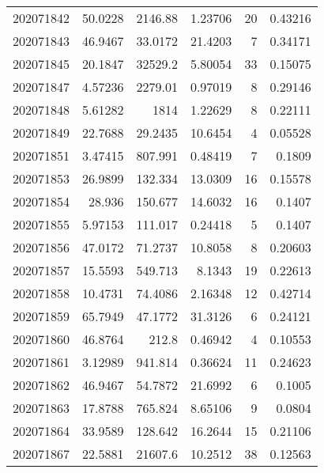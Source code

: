 \begin{tabular}{rrrrrr}
 202071842 &         50.0228  &     2146.88   &            1.23706 &          20 & 0.43216 \\
 202071843 &         46.9467  &       33.0172 &           21.4203  &           7 & 0.34171 \\
 202071845 &         20.1847  &    32529.2    &            5.80054 &          33 & 0.15075 \\
 202071847 &          4.57236 &     2279.01   &            0.97019 &           8 & 0.29146 \\
 202071848 &          5.61282 &     1814      &            1.22629 &           8 & 0.22111 \\
 202071849 &         22.7688  &       29.2435 &           10.6454  &           4 & 0.05528 \\
 202071851 &          3.47415 &      807.991  &            0.48419 &           7 & 0.1809  \\
 202071853 &         26.9899  &      132.334  &           13.0309  &          16 & 0.15578 \\
 202071854 &         28.936   &      150.677  &           14.6032  &          16 & 0.1407  \\
 202071855 &          5.97153 &      111.017  &            0.24418 &           5 & 0.1407  \\
 202071856 &         47.0172  &       71.2737 &           10.8058  &           8 & 0.20603 \\
 202071857 &         15.5593  &      549.713  &            8.1343  &          19 & 0.22613 \\
 202071858 &         10.4731  &       74.4086 &            2.16348 &          12 & 0.42714 \\
 202071859 &         65.7949  &       47.1772 &           31.3126  &           6 & 0.24121 \\
 202071860 &         46.8764  &      212.8    &            0.46942 &           4 & 0.10553 \\
 202071861 &          3.12989 &      941.814  &            0.36624 &          11 & 0.24623 \\
 202071862 &         46.9467  &       54.7872 &           21.6992  &           6 & 0.1005  \\
 202071863 &         17.8788  &      765.824  &            8.65106 &           9 & 0.0804  \\
 202071864 &         33.9589  &      128.642  &           16.2644  &          15 & 0.21106 \\
 202071867 &         22.5881  &    21607.6    &           10.2512  &          38 & 0.12563 \\

\end{tabular}
